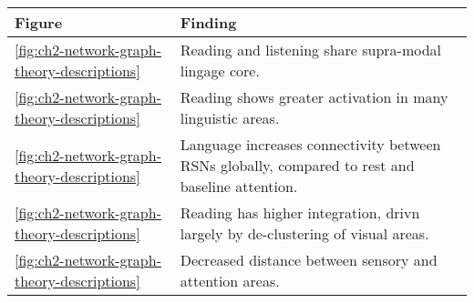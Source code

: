 \begin{tabular}{l|p{10cm}}
\toprule 
Figure & Finding \\ 
\midrule 
\ref{fig:ch2-network-graph-theory-descriptions} & Reading and listening share supra-modal lingage core. \\ 
 \ref{fig:ch2-network-graph-theory-descriptions} & Reading shows greater activation in many linguistic areas.	\\ 
\ref{fig:ch2-network-graph-theory-descriptions} & Language increases connectivity between RSNs globally, compared to rest and baseline attention.	 \\ 
\ref{fig:ch2-network-graph-theory-descriptions} & Reading has higher integration, drivn largely by de-clustering of visual areas.\\ 
\ref{fig:ch2-network-graph-theory-descriptions}  & Decreased distance between sensory and attention areas.  \\ 
\bottomrule 
\end{tabular}